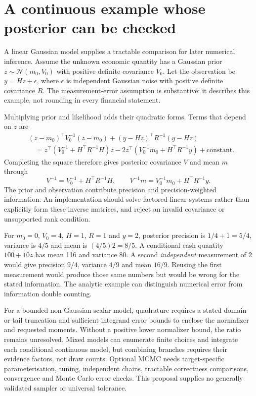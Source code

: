 \section{A continuous example whose posterior can be checked}

A linear Gaussian model supplies a tractable comparison for later numerical
inference. Assume the unknown economic quantity has a Gaussian prior
$z\sim\mathcal{N}(m_0,V_0)$ with positive definite covariance $V_0$.
Let the observation be $y=Hz+\epsilon$, where
$\epsilon$ is independent Gaussian noise with positive definite covariance
$R$. The measurement-error assumption is substantive: it describes this example,
not rounding in every financial statement.

Multiplying prior and likelihood adds their quadratic forms. Terms that depend
on $z$ are
\begin{align*}
 &(z-m_0)^\top V_0^{-1}(z-m_0)
 +(y-Hz)^\top R^{-1}(y-Hz)\\
 &\quad=z^\top(V_0^{-1}+H^\top R^{-1}H)z
 -2z^\top(V_0^{-1}m_0+H^\top R^{-1}y)+\text{constant}.
\end{align*}
Completing the square therefore gives posterior covariance $V$ and mean $m$
through
\[
 V^{-1}=V_0^{-1}+H^\top R^{-1}H,\qquad
 V^{-1}m=V_0^{-1}m_0+H^\top R^{-1}y.
\]
The prior and observation contribute precision and precision-weighted
information. An implementation should solve factored linear systems rather
than explicitly form these inverse matrices, and reject an invalid covariance
or unsupported rank condition.

For $m_0=0$, $V_0=4$, $H=1$, $R=1$ and $y=2$, posterior precision is
$1/4+1=5/4$, variance is $4/5$ and mean is $(4/5)2=8/5$. A conditional cash
quantity $100+10z$ has mean 116 and variance 80. A second \emph{independent}
measurement of 2 would give precision $9/4$, variance $4/9$ and mean $16/9$.
Reusing the first measurement would produce those same numbers but would be
wrong for the stated information. The analytic example can distinguish numerical
error from information double counting.

For a bounded non-Gaussian scalar model, quadrature requires a stated domain
or tail truncation and sufficient integrand error bounds to enclose the
normalizer and requested moments. Without a positive lower normalizer bound,
the ratio remains unresolved. Mixed models can enumerate finite choices and
integrate each conditional continuous model, but combining branches requires
their evidence factors, not draw counts. Optional MCMC needs target-specific
parameterisation, tuning, independent chains, tractable correctness comparisons,
convergence and Monte Carlo error checks. This proposal supplies no generally
validated sampler or universal tolerance.

